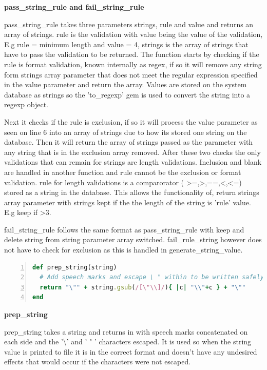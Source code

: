 \documentclass[a4paper,12pt]{article}
\begin{document}
\par \textbf{pass\_string\_rule and fail\_string\_rule}
\par pass\_string\_rule takes three parameters strings, rule and value and returns an array of strings. rule is the validation with value being the value of the validation, E.g rule = minimum length and value = 4, strings is the array of strings that have to pass the validation to be returned. The function starts by checking if the rule is format validation, known internally as regex, if so it will remove any string form strings array parameter that does not meet the regular expression specified in the value parameter and return the array. Values are stored on the system database as strings so the 'to\_regexp' gem\cite{regexpstrgem} is used to convert the string into a regexp object.
\vspace{3mm}
\par Next it checks if the rule is exclusion, if so it will process the value parameter as seen on line 6 into an array of strings due to how its stored one string on the database. Then it will return the array of strings passed as the parameter with any string that is in the exclusion array removed. After these two checks the only validations that can remain for strings are length validations. Inclusion and blank are handled in another function and rule cannot be the exclusion or format validation. rule for length validations is a comparorator ( \textgreater=,\textgreater,==,\textless,\textless=) stored as a string in the database. This allows the functionality of, return strings array parameter with strings kept if the the length of the string is 'rule' value. E.g keep if \textgreater 3.
\vspace{3mm}
\par fail\_string\_rule follows the same format as pass\_string\_rule with keep and delete string from string parameter array switched. fail\_rule\_string however does not have to check for exclusion as this is handled in generate\_string\_value.


\begin{lstlisting}[frame=single,numbers=left,language = ruby,caption= {prep\_string}, label={code:prepstr}]
def prep_string(string)
  # Add speech marks and escape \ " within to be written safely to test file
  return "\"" + string.gsub(/[\"\\]/){ |c| "\\"+c } + "\""
end
\end{lstlisting}

\par \textbf{prep\_string}
\par prep\_string takes a string and returns in with speech marks concatenated on each side and the '\textbackslash' and ' " ' characters escaped. It is used so when the string value is printed to file it is in the correct format and doesn't have any undesired effects that would occur if the characters were not escaped.
\end{document}
